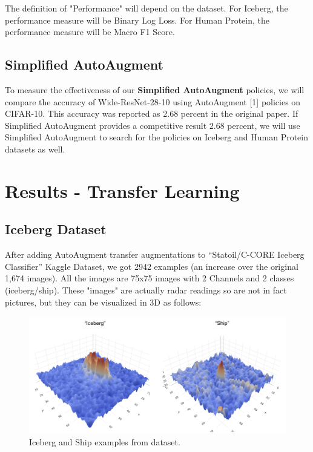 \documentclass[10pt,twocolumn,letterpaper]{article}
\begin{document}
The definition of "Performance" will depend on the dataset.  For Iceberg, the performance measure will be Binary Log Loss.  For Human Protein, the performance measure will be Macro F1 Score.

\subsection{Simplified AutoAugment}

To measure the effectiveness of our \textbf{Simplified AutoAugment} policies, we will compare the accuracy of Wide-ResNet-28-10 using AutoAugment [1] policies on CIFAR-10.  This accuracy was reported as 2.68 percent in the original paper.  If Simplified AutoAugment provides a competitive result 2.68 percent, we will use Simplified AutoAugment to search for the policies on Iceberg and Human Protein datasets as well.



\section{Results - Transfer Learning}

\subsection{Iceberg Dataset}

After adding AutoAugment transfer augmentations to “Statoil/C-CORE Iceberg Classifier” Kaggle Dataset, we got 2942 examples (an increase over the original 1,674 images). All the images are 75x75 images with 2 Channels and 2 classes (iceberg/ship).  These "images" are actually radar readings so are not in fact pictures,  but they can be visualized in 3D as follows:

\begin{figure}[bhp]
\includegraphics[width=\columnwidth]{iceberg_ship_example.png}
\caption{Iceberg and Ship examples from dataset.}
\end{figure}
\end{document}
